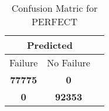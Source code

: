 \begin{table}[] 
\caption{Confusion Matric for PERFECT} 
\label{Table: Prediction Accuracy-DMDPERFECTOnlySunEKF-ignoreReflectionperfectNoFailurePrediction-Reflection} 
\centering 
\begin{tabular} 
 {@{}ccc@{}} 
\toprule 
\multicolumn{2}{c}{\textbf{Predicted}}
 \\ \midrule 
\multicolumn{1}{|c|}{Failure} & 
\multicolumn{1}{c|}{No Failure}
 \\ \midrule 
\multicolumn{1}{|c|}{\color{green}\textbf{77775}} & 
\multicolumn{1}{c|}{\color{red}\textbf{0}}
 \\ \midrule 
\multicolumn{1}{|c|}{\color{red}\textbf{0}} & 
\multicolumn{1}{c|}{\color{green}\textbf{92353}}
 \\ \bottomrule 
\end{tabular} 
\end{table} 
